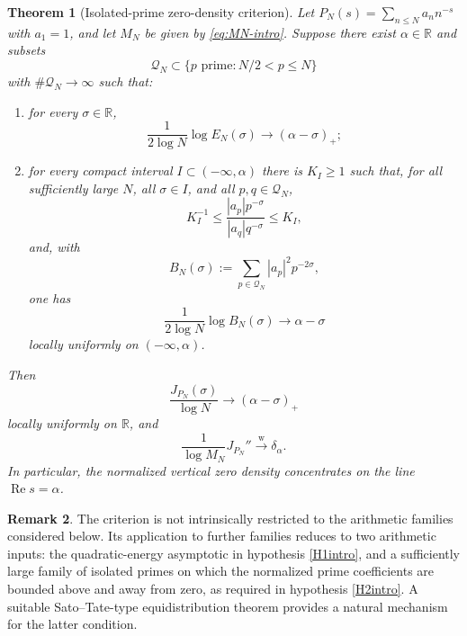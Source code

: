 \documentclass[11pt]{article}
\newtheorem{theorem}{Theorem}[section]
\theoremstyle{definition}
\newtheorem{remark}[theorem]{Remark}
\newcommand{\R}{\mathbb R}
\newcommand{\Ree}{\operatorname{Re}}
\newcommand{\1}{\mathbf 1}
\begin{document}
\begin{theorem}[Isolated-prime zero-density criterion]\label{thm:abstract-main}
Let $P_N(s)=\sum_{n\le N}a_n n^{-s}$ with $a_1=1$, and let $M_N$ be given by \eqref{eq:MN-intro}.  Suppose there exist $\alpha\in\R$ and subsets
\[
\mathcal Q_N\subset\{p\text{ prime}:N/2<p\le N\}
\]
with $\#\mathcal Q_N\to\infty$ such that:

\begin{enumerate}[label=\textup{(H\arabic*)}]
\item\label{H1intro} for every $\sigma\in\R$,
\begin{equation}\label{eq:H1-intro}
\frac{1}{2\log N}\log E_N(\sigma)
\longrightarrow(\alpha-\sigma)_+;
\end{equation}

\item\label{H2intro} for every compact interval $I\subset(-\infty,\alpha)$ there is $K_I\ge1$ such that, for all sufficiently large $N$, all $\sigma\in I$, and all $p,q\in\mathcal Q_N$,
\begin{equation}\label{eq:H2comp-intro}
K_I^{-1}
\le
\frac{|a_p|p^{-\sigma}}{|a_q|q^{-\sigma}}
\le K_I,
\end{equation}
and, with
\begin{equation}\label{eq:isolated-energy-intro}
B_N(\sigma):=\sum_{p\in\mathcal Q_N}|a_p|^2p^{-2\sigma},
\end{equation}
one has
\begin{equation}\label{eq:H2energy-intro}
\frac{1}{2\log N}\log B_N(\sigma)
\longrightarrow\alpha-\sigma
\end{equation}
locally uniformly on $(-\infty,\alpha)$.
\end{enumerate}

Then
\begin{equation}\label{eq:abstract-potential-intro}
\frac{J_{P_N}(\sigma)}{\log N}
\longrightarrow
(\alpha-\sigma)_+
\end{equation}
locally uniformly on $\R$, and
\begin{equation}\label{eq:abstract-measure-intro}
\frac1{\log M_N}J_{P_N}''
\xrightarrow{\mathrm w}\delta_\alpha.
\end{equation}
In particular, the normalized vertical zero density concentrates on the line $\Ree s=\alpha$.
\end{theorem}

\begin{remark}\label{rem:further-families}
The criterion is not intrinsically restricted to the arithmetic families considered below.  Its application to further families reduces to two arithmetic inputs: the quadratic-energy asymptotic in hypothesis \ref{H1intro}, and a sufficiently large family of isolated primes on which the normalized prime coefficients are bounded above and away from zero, as required in hypothesis \ref{H2intro}.  A suitable Sato--Tate-type equidistribution theorem provides a natural mechanism for the latter condition.
\end{remark}
\end{document}
